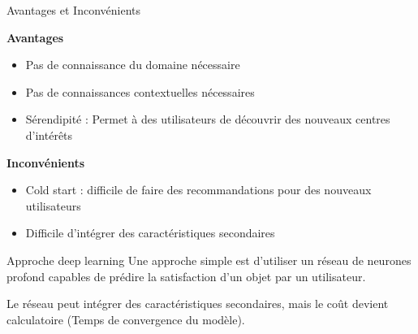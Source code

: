 \begin{frame}{Avantages et Inconvénients}
  \begin{minipage}[t]{0.49\linewidth}
    \textbf{\alert{Avantages}}
    \begin{itemize}
      \item Pas de connaissance du domaine nécessaire
      \item Pas de connaissances contextuelles nécessaires
      \item Sérendipité : Permet à des utilisateurs de découvrir des nouveaux centres d'intérêts
    \end{itemize}
  \end{minipage}
  \begin{minipage}[t]{0.49\linewidth}
    \textbf{\alert{Inconvénients}}
    \begin{itemize}
      \item Cold start : difficile de faire des recommandations pour des nouveaux utilisateurs
      \item Difficile d'intégrer des caractéristiques secondaires
    \end{itemize}
  \end{minipage}
\end{frame}

\begin{frame}{Approche deep learning}
  Une approche simple est d'utiliser un réseau de neurones profond capables de prédire la satisfaction d'un objet par un utilisateur.

  Le réseau peut intégrer des caractéristiques secondaires, mais le coût devient calculatoire (Temps de convergence du modèle).
  

\end{frame}
  